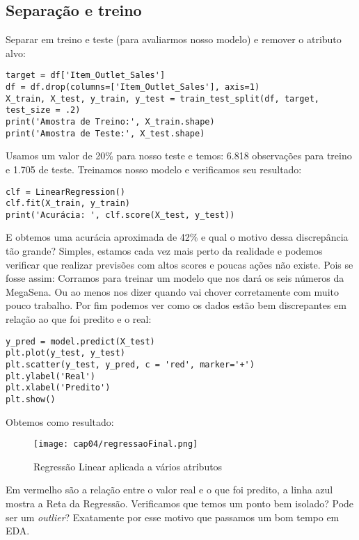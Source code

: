 \subsection{Separação e treino}

Separar em treino e teste (para avaliarmos nosso modelo) e remover o atributo alvo:
\begin{lstlisting}[]
target = df['Item_Outlet_Sales']
df = df.drop(columns=['Item_Outlet_Sales'], axis=1)
X_train, X_test, y_train, y_test = train_test_split(df, target, test_size = .2)
print('Amostra de Treino:', X_train.shape)
print('Amostra de Teste:', X_test.shape)
\end{lstlisting}

Usamos um valor de 20\% para nosso teste e temos: 6.818 observações para treino e 1.705 de teste. Treinamos nosso modelo e verificamos seu resultado:
\begin{lstlisting}[]
clf = LinearRegression()
clf.fit(X_train, y_train)
print('Acurácia: ', clf.score(X_test, y_test))
\end{lstlisting}

E obtemos uma acurácia aproximada de 42\% e qual o motivo dessa discrepância tão grande? Simples, estamos cada vez mais perto da realidade e podemos verificar que realizar previsões com altos scores e poucas ações não existe. Pois se fosse assim: Corramos para treinar um modelo que nos dará os seis números da MegaSena. Ou ao menos nos dizer quando vai chover corretamente com muito pouco trabalho. Por fim podemos ver como os dados estão bem discrepantes em relação ao que foi predito e o real:
\begin{lstlisting}[]
y_pred = model.predict(X_test)
plt.plot(y_test, y_test)
plt.scatter(y_test, y_pred, c = 'red', marker='+')
plt.ylabel('Real')
plt.xlabel('Predito')
plt.show()
\end{lstlisting}

Obtemos como resultado:
\begin{figure}[H]
	\centering
	\texttt{[image: cap04/regressaoFinal.png]}
	\caption{Regressão Linear aplicada a vários atributos}
\end{figure}

Em vermelho são a relação entre o valor real e o que foi predito, a linha azul mostra a Reta da Regressão. Verificamos que temos um ponto bem isolado? Pode ser um \textit{outlier}? Exatamente por esse motivo que passamos um bom tempo em EDA.

\clearpage

